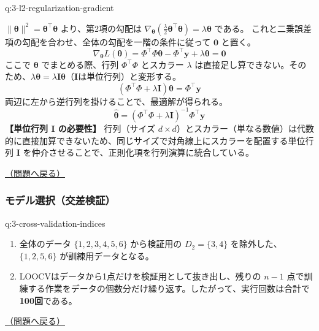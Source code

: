 \documentclass[
  pandoc]{bxjsarticle}
\providecommand{\tightlist}{%
  \setlength{\itemsep}{0pt}\setlength{\parskip}{0pt}}
\begin{document}
\begin{answerbox}[phantomlabel=a:3-l2-regularization-gradient]{q:3-l2-regularization-gradient}

\(\|\boldsymbol{\theta}\|^2 = \boldsymbol{\theta}^\top \boldsymbol{\theta}\)
より、第2項の勾配は
\(\nabla_{\boldsymbol{\theta}} \left( \frac{\lambda}{2} \boldsymbol{\theta}^\top \boldsymbol{\theta} \right) = \lambda \boldsymbol{\theta}\)
である。 これと二乗誤差項の勾配を合わせ、全体の勾配を一階の条件に従って
\(\mathbf{0}\) と置く。 \[
\nabla_{\boldsymbol{\theta}} L(\boldsymbol{\theta}) = \Phi^\top \Phi \boldsymbol{\theta} - \Phi^\top \mathbf{y} + \lambda \boldsymbol{\theta} = \mathbf{0}
\] ここで \(\boldsymbol{\theta}\) でまとめる際、行列 \(\Phi^\top \Phi\)
とスカラー \(\lambda\)
は直接足し算できない。そのため、\(\lambda \boldsymbol{\theta} = \lambda \mathbf{I} \boldsymbol{\theta}\)（\(\mathbf{I}\)は単位行列）と変形する。
\[
(\Phi^\top \Phi + \lambda \mathbf{I})\boldsymbol{\theta} = \Phi^\top \mathbf{y}
\] 両辺に左から逆行列を掛けることで、最適解が得られる。 \[
\hat{\boldsymbol{\theta}} = (\Phi^\top \Phi + \lambda \mathbf{I})^{-1}\Phi^\top \mathbf{y}
\] \textbf{【単位行列 $\mathbf{I}$ の必要性】} 行列（サイズ
\(d \times d\)）とスカラー（単なる数値）は代数的に直接加算できないため、同じサイズで対角線上にスカラーを配置する単位行列
\(\mathbf{I}\) を仲介させることで、正則化項を行列演算に統合している。

\hfill 

\hyperref[q:3-l2-regularization-gradient]{（問題へ戻る）}

\end{answerbox}

\subsubsection{モデル選択（交差検証）}\label{ux30e2ux30c7ux30ebux9078ux629eux4ea4ux5deeux691cux8a3c-1}

\begin{answerbox}[phantomlabel=a:3-cross-validation-indices]{q:3-cross-validation-indices}

\begin{enumerate}
\def\labelenumi{\arabic{enumi}.}
\tightlist
\item
  全体のデータ \(\{1,2,3,4,5,6\}\) から検証用の \(D_2 = \{3,4\}\)
  を除外した、\textbf{$\{1, 2, 5, 6\}$} が訓練用データとなる。
\item
  LOOCVはデータから1点だけを検証用として抜き出し、残りの \(n-1\)
  点で訓練する作業をデータの個数分だけ繰り返す。したがって、実行回数は合計で\textbf{100回}である。
\end{enumerate}

\hfill 

\hyperref[q:3-cross-validation-indices]{（問題へ戻る）}

\end{answerbox}
\end{document}
